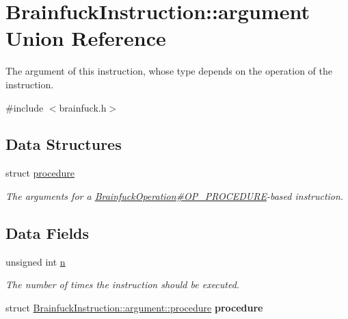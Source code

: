 \hypertarget{unionBrainfuckInstruction_1_1argument}{}\section{Brainfuck\+Instruction\+:\+:argument Union Reference}
\label{unionBrainfuckInstruction_1_1argument}


The argument of this instruction, whose type depends on the operation of the instruction.  




{\ttfamily \#include $<$brainfuck.\+h$>$}

\subsection*{Data Structures}
\begin{DoxyCompactItemize}
\item 
struct \hyperlink{structBrainfuckInstruction_1_1argument_1_1procedure}{procedure}
\begin{DoxyCompactList}\small\item\em The arguments for a \hyperlink{group__ast_ggac30413d006b783ec42faef68b2aa6c12a509f8710cbb162ea87eb762a04fa7d05}{Brainfuck\+Operation\#\+O\+P\+\_\+\+P\+R\+O\+C\+E\+D\+U\+R\+E}-\/based instruction. \end{DoxyCompactList}\end{DoxyCompactItemize}
\subsection*{Data Fields}
\begin{DoxyCompactItemize}
\item 
\hypertarget{unionBrainfuckInstruction_1_1argument_abeafd3a0026c3856940598de343f76d8}{}unsigned int \hyperlink{unionBrainfuckInstruction_1_1argument_abeafd3a0026c3856940598de343f76d8}{n}\label{unionBrainfuckInstruction_1_1argument_abeafd3a0026c3856940598de343f76d8}

\begin{DoxyCompactList}\small\item\em The number of times the instruction should be executed. \end{DoxyCompactList}\item 
\hypertarget{unionBrainfuckInstruction_1_1argument_a08de0883711f53c60c1f7057b49a0841}{}struct \hyperlink{structBrainfuckInstruction_1_1argument_1_1procedure}{Brainfuck\+Instruction\+::argument\+::procedure} {\bfseries procedure}\label{unionBrainfuckInstruction_1_1argument_a08de0883711f53c60c1f7057b49a0841}

\end{DoxyCompactItemize}


